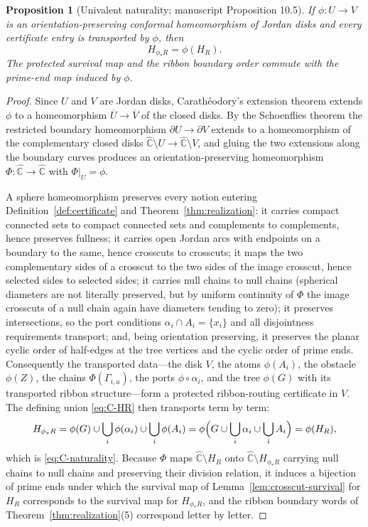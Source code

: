 \documentclass[11pt,reqno]{amsart}
\newtheorem{proposition}[theorem]{Proposition}
\theoremstyle{definition}
\theoremstyle{remark}
\newcommand{\Chat}{\widehat{\mathbb C}}
\begin{document}
\begin{proposition}[Univalent naturality; manuscript Proposition 10.5]
\label{prop:naturality}
If $\phi\colon U\to V$ is an orientation-preserving conformal
homeomorphism of Jordan disks and every certificate entry is transported
by $\phi$, then
\begin{equation}\label{eq:C-naturality}
H_{\phi_*R}=\phi(H_R).
\end{equation}
The protected survival map and the ribbon boundary order commute with the
prime-end map induced by $\phi$.
\end{proposition}

\begin{proof}
Since $U$ and $V$ are Jordan disks, Carath\'eodory's extension theorem
\cite{Pom92} extends $\phi$ to a homeomorphism
$\overline U\to\overline V$ of the closed disks.  By the Schoenflies
theorem the restricted boundary homeomorphism
$\partial U\to\partial V$ extends to a homeomorphism of the complementary
closed disks $\Chat\setminus U\to\Chat\setminus V$, and gluing the two
extensions along the boundary curves produces an orientation-preserving
homeomorphism $\Phi\colon\Chat\to\Chat$ with $\Phi|_U=\phi$.

A sphere homeomorphism preserves every notion entering
Definition~\ref{def:certificate} and Theorem~\ref{thm:realization}: it
carries compact connected sets to compact connected sets and complements
to complements, hence preserves fullness; it carries open Jordan arcs
with endpoints on a boundary to the same, hence crosscuts to crosscuts;
it maps the two complementary sides of a crosscut to the two sides of the
image crosscut, hence selected sides to selected sides; it carries null
chains to null chains (spherical diameters are not literally preserved,
but by uniform continuity of $\Phi$ the image crosscuts of a null chain
again have diameters tending to zero); it preserves intersections, so the
port conditions $\alpha_i\cap A_i=\{x_i\}$ and all disjointness
requirements transport; and, being orientation preserving, it preserves
the planar cyclic order of half-edges at the tree vertices and the cyclic
order of prime ends.  Consequently the transported data---the disk $V$,
the atoms $\phi(A_i)$, the obstacle $\phi(Z)$, the chains
$\Phi(\Gamma_{i,a})$, the ports $\phi\circ\alpha_i$, and the tree
$\phi(G)$ with its transported ribbon structure---form a protected
ribbon-routing certificate in $V$.  The defining union \eqref{eq:C-HR}
then transports term by term:
\[
H_{\phi_*R}
=\phi(G)\cup\bigcup_i\phi(\alpha_i)\cup\bigcup_i\phi(A_i)
=\phi\Bigl(G\cup\bigcup_i\alpha_i\cup\bigcup_iA_i\Bigr)
=\phi(H_R),
\]
which is \eqref{eq:C-naturality}.  Because $\Phi$ maps
$\Chat\setminus H_R$ onto $\Chat\setminus H_{\phi_*R}$ carrying null
chains to null chains and preserving their division relation, it induces
a bijection of prime ends under which the survival map of
Lemma~\ref{lem:crosscut-survival} for $H_R$ corresponds to the survival
map for $H_{\phi_*R}$, and the ribbon boundary words of
Theorem~\ref{thm:realization}(5) correspond letter by letter.
\end{proof}
\end{document}
